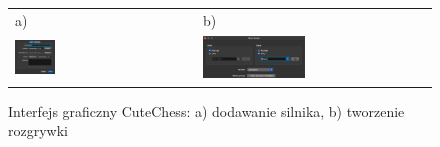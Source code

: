 \begin{figure}[ht]
    \centering
    \begin{tabular}{@{}ll@{}}
        a) & b) \\
        \includegraphics[width=0.23\textwidth]{dodatki/dodatekA/rysunki/instrukcja}
        &
        \includegraphics[width=0.46\textwidth]{dodatki/dodatekA/rysunki/nowa-gra}
    \end{tabular}
    \caption{Interfejs graficzny CuteChess: a) dodawanie silnika, b) tworzenie rozgrywki}
    \label{fig: integracja-z-gui}

\end{figure}

